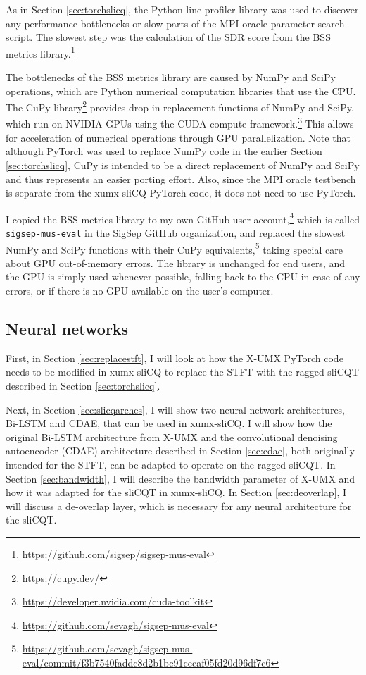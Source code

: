 \documentclass[report.tex]{subfiles}
\begin{document}
As in Section \ref{sec:torchslicq}, the Python line-profiler library was used to discover any performance bottlenecks or slow parts of the MPI oracle parameter search script. The slowest step was the calculation of the SDR score from the BSS metrics library.\footnote{\url{https://github.com/sigsep/sigsep-mus-eval}}

The bottlenecks of the BSS metrics library are caused by NumPy and SciPy operations, which are Python numerical computation libraries that use the CPU. The CuPy library\footnote{\url{https://cupy.dev/}} provides drop-in replacement functions of NumPy and SciPy, which run on NVIDIA GPUs using the CUDA compute framework.\footnote{\url{https://developer.nvidia.com/cuda-toolkit}} This allows for acceleration of numerical operations through GPU parallelization. Note that although PyTorch was used to replace NumPy code in the earlier Section \ref{sec:torchslicq}, CuPy is intended to be a direct replacement of NumPy and SciPy and thus represents an easier porting effort. Also, since the MPI oracle testbench is separate from the xumx-sliCQ PyTorch code, it does not need to use PyTorch.

I copied the BSS metrics library to my own GitHub user account,\footnote{\url{https://github.com/sevagh/sigsep-mus-eval}} which is called \Verb#sigsep-mus-eval# in the SigSep GitHub organization, and replaced the slowest NumPy and SciPy functions with their CuPy equivalents,\footnote{\url{https://github.com/sevagh/sigsep-mus-eval/commit/f3b7540faddc8d2b1bc91cecaf05fd20d96df7c6}} taking special care about GPU out-of-memory errors. The library is unchanged for end users, and the GPU is simply used whenever possible, falling back to the CPU in case of any errors, or if there is no GPU available on the user's computer.

\newpagefill

\subsection{Neural networks}
\label{sec:neuralnet}

First, in Section \ref{sec:replacestft}, I will look at how the X-UMX PyTorch code needs to be modified in xumx-sliCQ to replace the STFT with the ragged sliCQT described in Section \ref{sec:torchslicq}.

Next, in Section \ref{sec:slicqarches}, I will show two neural network architectures, Bi-LSTM and CDAE, that can be used in xumx-sliCQ. I will show how the original Bi-LSTM architecture from X-UMX and the convolutional denoising autoencoder (CDAE) architecture described in Section \ref{sec:cdae}, both originally intended for the STFT, can be adapted to operate on the ragged sliCQT. In Section \ref{sec:bandwidth}, I will describe the bandwidth parameter of X-UMX and how it was adapted for the sliCQT in xumx-sliCQ. In Section \ref{sec:deoverlap}, I will discuss a de-overlap layer, which is necessary for any neural architecture for the sliCQT.
\end{document}

